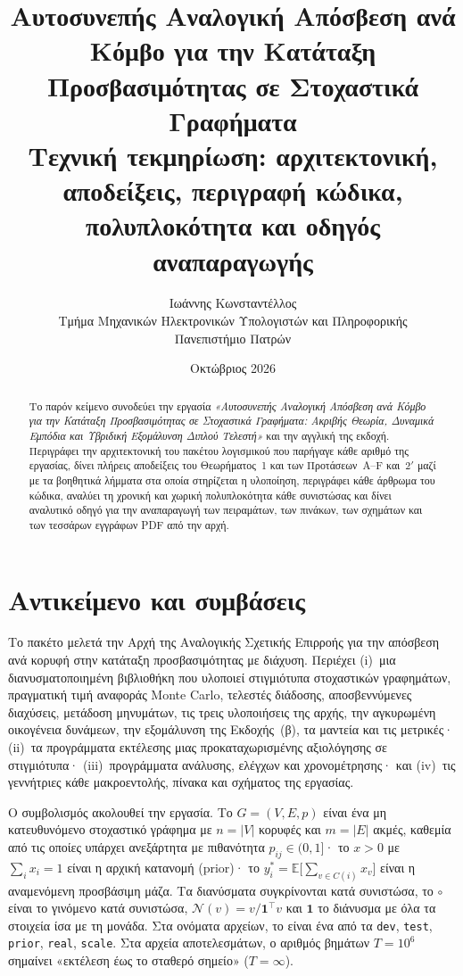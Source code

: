 \documentclass[11pt,a4paper]{article}
\title{\textbf{Αυτοσυνεπής Αναλογική Απόσβεση ανά Κόμβο για την Κατάταξη Προσβασιμότητας σε Στοχαστικά Γραφήματα}\\[4pt]
\large Τεχνική τεκμηρίωση: αρχιτεκτονική, αποδείξεις, περιγραφή κώδικα, πολυπλοκότητα και οδηγός αναπαραγωγής}
\author{Ιωάννης Κωνσταντέλλος\\[2pt]
\small Τμήμα Μηχανικών Ηλεκτρονικών Υπολογιστών και Πληροφορικής\\
\small Πανεπιστήμιο Πατρών}
\date{Οκτώβριος 2026}
\theoremstyle{definition}
\theoremstyle{plain}
\newcommand{\E}{\mathbb{E}}
\newcommand{\N}{\mathcal{N}}
\newcommand{\one}{\mathbf{1}}
\newcommand{\file}[1]{\path{#1}}
\begin{document}
\maketitle

\begin{abstract}
\noindent Το παρόν κείμενο συνοδεύει την εργασία \emph{«Αυτοσυνεπής Αναλογική Απόσβεση ανά Κόμβο για την Κατάταξη Προσβασιμότητας σε Στοχαστικά Γραφήματα: Ακριβής Θεωρία, Δυναμικά Εμπόδια και Υβριδική Εξομάλυνση Διπλού Τελεστή»} και την αγγλική της εκδοχή. Περιγράφει την αρχιτεκτονική του πακέτου λογισμικού που παρήγαγε κάθε αριθμό της εργασίας, δίνει πλήρεις αποδείξεις του Θεωρήματος~1 και των Προτάσεων~A--F και~$2'$ μαζί με τα βοηθητικά λήμματα στα οποία στηρίζεται η υλοποίηση, περιγράφει κάθε άρθρωμα του κώδικα, αναλύει τη χρονική και χωρική πολυπλοκότητα κάθε συνιστώσας και δίνει αναλυτικό οδηγό για την αναπαραγωγή των πειραμάτων, των πινάκων, των σχημάτων και των τεσσάρων εγγράφων PDF από την αρχή.
\end{abstract}

\tableofcontents

\section{Αντικείμενο και συμβάσεις}\label{sec:scope}

Το πακέτο μελετά την Αρχή της Αναλογικής Σχετικής Επιρροής για την απόσβεση ανά κορυφή στην κατάταξη προσβασιμότητας με διάχυση. Περιέχει (i)~μια διανυσματοποιημένη βιβλιοθήκη που υλοποιεί στιγμιότυπα στοχαστικών γραφημάτων, πραγματική τιμή αναφοράς Monte Carlo, τελεστές διάδοσης, αποσβεννύμενες διαχύσεις, μετάδοση μηνυμάτων, τις τρεις υλοποιήσεις της αρχής, την αγκυρωμένη οικογένεια δυνάμεων, την εξομάλυνση της Εκδοχής~(β), τα μαντεία και τις μετρικές· (ii)~τα προγράμματα εκτέλεσης μιας προκαταχωρισμένης αξιολόγησης σε \NTotal{} στιγμιότυπα· (iii)~προγράμματα ανάλυσης, ελέγχων και χρονομέτρησης· και (iv)~τις γεννήτριες κάθε μακροεντολής, πίνακα και σχήματος της εργασίας.

Ο συμβολισμός ακολουθεί την εργασία. Το $G=(V,E,p)$ είναι ένα μη κατευθυνόμενο στοχαστικό γράφημα με $n=|V|$ κορυφές και $m=|E|$ ακμές, καθεμία από τις οποίες υπάρχει ανεξάρτητα με πιθανότητα $p_{ij}\in(0,1]$· το $x>0$ με $\sum_ix_i=1$ είναι η αρχική κατανομή (prior)· το $y^*_i=\E\big[\sum_{v\in C(i)}x_v\big]$ είναι η αναμενόμενη προσβάσιμη μάζα. Τα διανύσματα συγκρίνονται κατά συνιστώσα, το $\circ$ είναι το γινόμενο κατά συνιστώσα, $\N(v)=v/\one^{\top}v$ και $\one$ το διάνυσμα με όλα τα στοιχεία ίσα με τη μονάδα. Στα ονόματα αρχείων, το \file{<panel>} είναι ένα από τα \texttt{dev}, \texttt{test}, \texttt{prior}, \texttt{real}, \texttt{scale}. Στα αρχεία αποτελεσμάτων, ο αριθμός βημάτων $T=10^6$ σημαίνει «εκτέλεση έως το σταθερό σημείο» ($T=\infty$).
\end{document}
